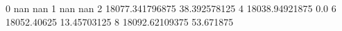 0 nan nan
1 nan nan
2 18077.341796875 38.392578125
4 18038.94921875 0.0
6 18052.40625 13.45703125
8 18092.62109375 53.671875

